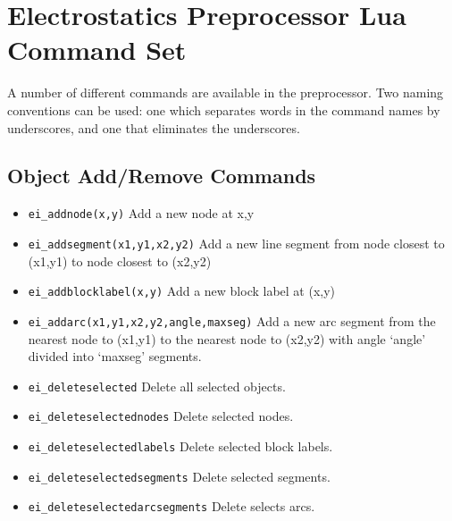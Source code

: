 
\section{Electrostatics Preprocessor Lua Command Set}

A number of different commands are available in the preprocessor.
Two naming conventions can be used: one which separates words in
the command names by underscores, and one that eliminates the
underscores.

\subsection{Object Add/Remove Commands}
\begin{itemize}
\item {\tt ei\_addnode(x,y)} Add a new node at x,y

\item {\tt ei\_addsegment(x1,y1,x2,y2)} Add a new line segment from node closest to
(x1,y1) to node closest to (x2,y2)

\item {\tt ei\_addblocklabel(x,y)} Add a new block label at (x,y)

\item {\tt ei\_addarc(x1,y1,x2,y2,angle,maxseg)} Add a new arc segment from the
nearest node to (x1,y1) to the nearest node to (x2,y2) with angle `angle'
divided into `maxseg' segments.

\item {\tt ei\_deleteselected} Delete all selected objects.

\item {\tt ei\_deleteselectednodes} Delete selected nodes.

\item {\tt ei\_deleteselectedlabels} Delete selected block labels.

\item {\tt ei\_deleteselectedsegments} Delete selected segments.

\item {\tt ei\_deleteselectedarcsegments} Delete selects arcs.
\end{itemize}


